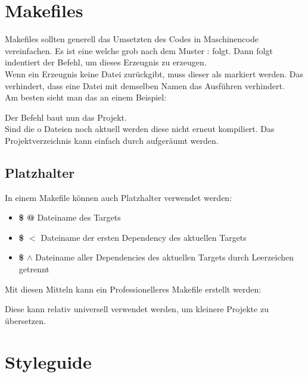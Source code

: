 \section{Makefiles}

Makefiles sollten generell das Umsetzten des Codes in Maschinencode vereinfachen.
Es ist eine  welche grob nach dem Muster  :  folgt. 
Dann folgt indentiert der Befehl, um dieses Erzeugnis zu erzeugen.\\
Wenn ein Erzeugnis keine Datei zurückgibt, muss dieser als  markiert werden. 
Das verhindert, dass eine Datei mit demselben Namen das Ausführen verhindert.\\
Am besten sieht man das an einem Beispiel:

\nextcol



Der Befehl  baut nun das Projekt.\\
Sind die o Dateien noch aktuell werden diese nicht erneut kompiliert. 
Das Projektverzeichnis kann einfach durch  aufgeräumt werden.

\subsection{Platzhalter}

In einem Makefile können auch Platzhalter verwendet werden:

\begin{itemize}[itemsep=1pt, parsep=0pt]
    \item \textbf{\$ @} Dateiname des Targets
    \item \textbf{\$ $<$} Dateiname der ersten Dependency des aktuellen Targets
    \item \textbf{\$ $\wedge$} Dateiname aller Dependencies des aktuellen Targets durch Leerzeichen getrennt
\end{itemize}

Mit diesen Mitteln kann ein Professionelleres Makefile erstellt werden:



Diese kann relativ universell verwendet werden, um kleinere Projekte zu übersetzen.

\nextcol

\section{Styleguide}

